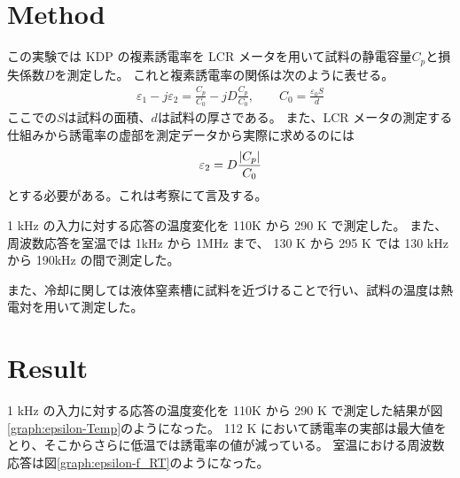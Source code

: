 \documentclass[9pt,dvipdfmx,a4paper]{jsarticle}
\begin{document}
\section{Method}
この実験では KDP の複素誘電率を LCR メータを用いて試料の静電容量\(C_p\)と損失係数\(D\)を測定した。
これと複素誘電率の関係は次のように表せる。
\begin{align}
    \varepsilon_1 - j\varepsilon_2 = \frac{C_p}{C_0}-jD\frac{C_p}{C_0}, \qquad
    C_0 = \frac{\varepsilon_0 S}{d}
\end{align}
ここでの\(S\)は試料の面積、\(d\)は試料の厚さである。
また、LCR メータの測定する仕組みから誘電率の虚部を測定データから実際に求めるのには
\begin{align}
    \varepsilon_2 = D \frac{\abs{C_p}}{C_0}
\end{align}
とする必要がある。これは考察にて言及する。

1 kHz の入力に対する応答の温度変化を 110K から 290 K で測定した。
また、周波数応答を室温では 1kHz から 1MHz まで、
130 K から 295 K では 130 kHz から 190kHz の間で測定した。

また、冷却に関しては液体窒素槽に試料を近づけることで行い、試料の温度は熱電対を用いて測定した。

\clearpage
\section{Result}
1 kHz の入力に対する応答の温度変化を 110K から 290 K で測定した結果が図\ref{graph:epsilon-Temp}のようになった。
112 K において誘電率の実部は最大値をとり、そこからさらに低温では誘電率の値が減っている。
室温における周波数応答は図\ref{graph:epsilon-f_RT}のようになった。
\end{document}
